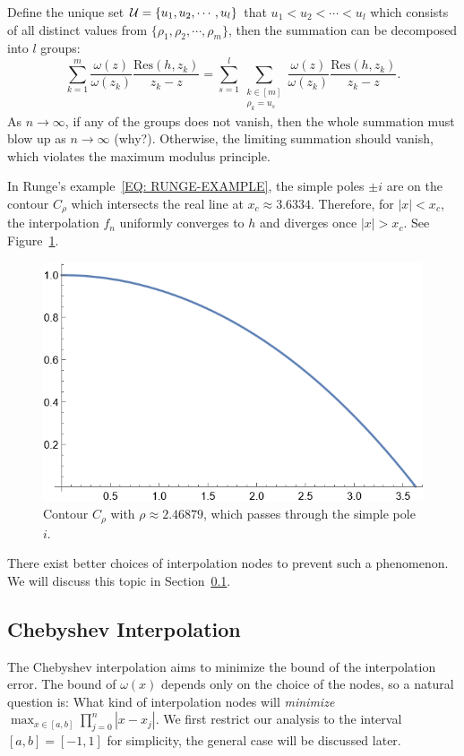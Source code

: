 Define the unique set $\mathcal U = \{u_1, u_2,\cdots, u_l\}$ that $u_1 < u_2<\cdots < u_l$ which consists of all distinct values from $\{ \rho_1, \rho_2, \cdots,  \rho_m\}$, then the summation can be decomposed into $l$ groups:
\begin{equation}
 \sum_{k=1}^m \frac{\omega(z)}{\omega(z_k)}\frac{\mathrm{Res}(h, z_k)}{z_k - z} = \sum_{s=1}^l \sum_{\substack{k\in [m] \\ \rho_k = u_s}} \frac{\omega(z)}{\omega(z_k)}\frac{\mathrm{Res}(h, z_k)}{z_k - z}.
\end{equation}
As $n\to\infty$, if any of the groups does not vanish, then the whole summation must blow up as $n\to\infty$ (why?). Otherwise, the limiting summation should vanish, which violates the maximum modulus principle. 

In Runge's example~\eqref{EQ: RUNGE-EXAMPLE}, the simple poles $\pm i$ are on the contour $C_{\rho}$ which intersects the real line at $x_c\approx 3.6334$. Therefore, for $|x| < x_c$, the interpolation $f_n$ uniformly converges to $h$ and diverges once $|x| > x_c$. See Figure~\ref{fig:contour-curve}.
\begin{figure}[!htb]
    \centering
    \includegraphics[scale=0.65]{Figures/contour-curve.png}
    \caption{Contour $C_{\rho}$ with $\rho \approx 2.46879$, which passes through the simple pole $i$.}
    \label{fig:contour-curve}
\end{figure}
There exist better choices of interpolation nodes to prevent such a phenomenon. We will discuss this topic in Section~\ref{Sec: 2-Che-Int}. 

\subsection{Chebyshev Interpolation}
\label{Sec: 2-Che-Int}
The Chebyshev interpolation aims to minimize the bound of the interpolation error. The bound of $\omega(x)$ depends only on the choice of the nodes, so a natural question is: What kind of interpolation nodes will \emph{minimize} 
$\max_{x\in [a, b]} \prod_{j=0}^n |x-x_j|$. We first restrict our analysis to the interval $[a, b] = [-1,1]$ for simplicity, the general case will be discussed later.
 
